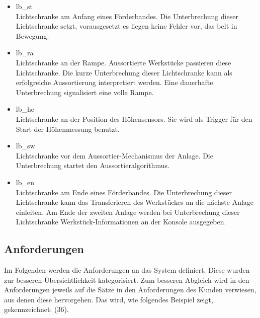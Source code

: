 \begin{itemize}
\begin{itemize}
        \item \gls{lb_st}\\
        Lichtschranke am Anfang eines Förderbandes.
        Die Unterbrechung dieser Lichtschranke setzt, vorausgesetzt es liegen keine
        Fehler vor, das \gls{belt} in Bewegung.
        \item \gls{lb_ra}\\
        Lichtschranke an der Rampe. Aussortierte Werkstücke passieren diese Lichtschranke.
        Die kurze Unterbrechung dieser Lichtschranke kann als erfolgreiche Aussortierung interpretiert werden.
        Eine dauerhafte Unterbrechung signalisiert eine volle Rampe.
        \item \gls{lb_he}\\
        Lichtschranke an der Position des Höhensensors.
        Sie wird als Trigger für den Start der Höhenmessung benutzt.
        \item \gls{lb_sw}\\
        Lichtschranke vor dem Aussortier-Mechanismus der Anlage.
        Die Unterbrechung startet den Aussortieralgorithmus.
        \item \gls{lb_en}\\
        Lichtschranke am Ende eines Förderbandes.
        Die Unterbrechung dieser Lichtschranke kann das Transferieren des Werkstückes an die nächste Anlage einleiten.
        Am Ende der zweiten Anlage werden bei Unterbrechung dieser Lichtschranke Werkstück-Informationen an der Konsole ausgegeben.
    \end{itemize}
\end{itemize}

\subsection{Anforderungen}\label{subsec:anforderungen2}
Im Folgenden werden die Anforderungen an das System definiert. Diese wurden zur besseren
Übersichtlichkeit kategorisiert. Zum besseren Abgleich wird in den
Anforderungen jeweils auf die Sätze in den Anforderungen des Kunden verwiesen, aus denen diese hervorgehen.
Das wird, wie folgendes Beispiel zeigt, gekennzeichnet: (36). 


\FloatBarrier


